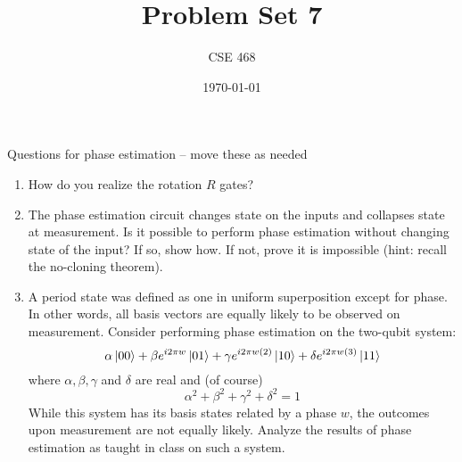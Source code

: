 \documentclass[12pt]{article}
\title{Problem Set 7}
\author{CSE 468}
\date{\today}
\begin{document}
\maketitle


Questions for phase estimation -- move these as needed

\begin{enumerate}[font=\bfseries]
    \item How do you realize the rotation $R$ gates?
    \item The phase estimation circuit changes state on the inputs and collapses state at measurement.  Is it possible to perform phase estimation without changing state of the input?  If so, show how. If not, prove it is impossible (hint:  recall the no-cloning theorem).
    \item A period state was defined as one in uniform superposition except for phase.  In other words, all basis vectors are equally likely to be observed on measurement.  Consider performing phase estimation on the two-qubit system:
    \[ \alpha\ket{00} + \beta e^{i 2\pi w}\ket{01} 
        + \gamma e^{i 2\pi w(2)}\ket{10} + \delta e^{i 2\pi w(3)}\ket{11}
    \]
    where $\alpha, \beta, \gamma$ and $\delta$ are real and (of course)
    \[ \alpha^{2} + \beta^{2} + \gamma^{2} + \delta^{2}=1 \]
    While this system has its basis states related by a phase $w$, the outcomes upon measurement are not equally likely.  Analyze the results of phase estimation as taught in class on such a system.

    
\end{enumerate}
\end{document}
